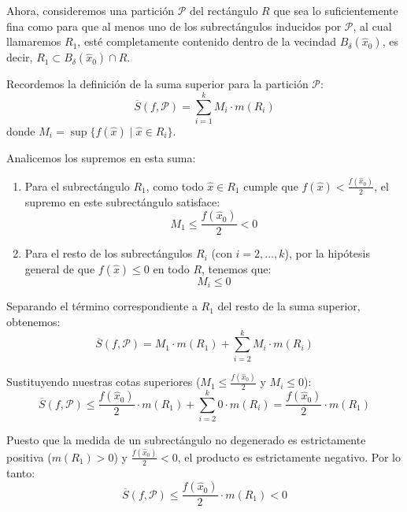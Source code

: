 \documentclass[11pt,letterpaper]{article}
\begin{document}
Ahora, consideremos una partición $\mathcal{P}$ del rectángulo $R$ que sea lo suficientemente fina como para que al menos uno de los subrectángulos inducidos por $\mathcal{P}$, al cual llamaremos $R_1$, esté completamente contenido dentro de la vecindad $B_\delta(\hat{x}_0)$, es decir, $R_1 \subset B_\delta(\hat{x}_0) \cap R$.

Recordemos la definición de la suma superior para la partición $\mathcal{P}$:
\begin{equation*}
\overline{S}(f, \mathcal{P}) = \sum_{i=1}^{k} M_i \cdot m(R_i)
\end{equation*}
donde $M_i = \sup \{ f(\hat{x}) \mid \hat{x} \in R_i \}$.

Analicemos los supremos en esta suma:
\begin{enumerate}
    \item Para el subrectángulo $R_1$, como todo $\hat{x} \in R_1$ cumple que $f(\hat{x}) < \frac{f(\hat{x}_0)}{2}$, el supremo en este subrectángulo satisface:
    \begin{equation*}
    M_1 \le \frac{f(\hat{x}_0)}{2} < 0
    \end{equation*}
    \item Para el resto de los subrectángulos $R_i$ (con $i = 2, \dots, k$), por la hipótesis general de que $f(\hat{x}) \le 0$ en todo $R$, tenemos que:
    \begin{equation*}
    M_i \le 0
    \end{equation*}
\end{enumerate}

Separando el término correspondiente a $R_1$ del resto de la suma superior, obtenemos:
\begin{equation*}
\overline{S}(f, \mathcal{P}) = M_1 \cdot m(R_1) + \sum_{i=2}^{k} M_i \cdot m(R_i)
\end{equation*}

Sustituyendo nuestras cotas superiores ($M_1 \le \frac{f(\hat{x}_0)}{2}$ y $M_i \le 0$):
\begin{equation*}
\overline{S}(f, \mathcal{P}) \le \frac{f(\hat{x}_0)}{2} \cdot m(R_1) + \sum_{i=2}^{k} 0 \cdot m(R_i) = \frac{f(\hat{x}_0)}{2} \cdot m(R_1)
\end{equation*}

Puesto que la medida de un subrectángulo no degenerado es estrictamente positiva ($m(R_1) > 0$) y $\frac{f(\hat{x}_0)}{2} < 0$, el producto es estrictamente negativo. Por lo tanto:
\begin{equation*}
\overline{S}(f, \mathcal{P}) \le \frac{f(\hat{x}_0)}{2} \cdot m(R_1) < 0
\end{equation*}
\end{document}
